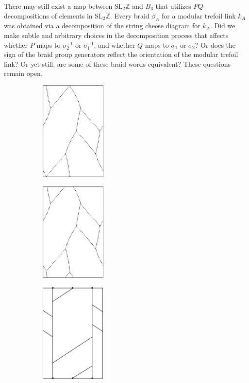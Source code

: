 \documentclass[12pt,twoside]{reedthesis}
\theoremstyle{definition}
\newcommand{\Z}{\mathbb{Z}}
\newcommand{\SLZ}{\mathrm{SL}_2{\Z}}
\begin{document}
There may still exist a map between $\SLZ$ and $B_3$ that utilizes $PQ$ decompositions of elements in $\SLZ$.
Every braid $\beta_A$ for a modular trefoil link $k_A$ was obtained via a decomposition of the string cheese diagram for $k_A$. 
Did we make subtle and arbitrary choices in the decomposition process that affects whether $P$ maps to $\sigma_2^{-1}$ or $\sigma_1^{-1}$, and whether $Q$ maps to $\sigma_1$ or $\sigma_2$?
Or does the sign of the braid group generators reflect the orientation of the modular trefoil link?
Or yet still, are some of these braid words equivalent? These questions remain open.

\begin{figure}[p]
  \centering
  \begin{subfigure}[t]{0.24\linewidth}
    \centering
    \includegraphics[height=5cm]{figures/subset_loop_ppqq.pdf}
    \caption{}
  \end{subfigure}
  \hfill
  \begin{subfigure}[t]{0.24\linewidth}
    \centering
    \includegraphics[height=5cm]{figures/subset_loop_ppqq_shifted.pdf}
    \caption{}
  \end{subfigure}
  \hfill
  \begin{subfigure}[t]{0.24\linewidth}
    \centering
    \includegraphics[height=5cm]{figures/subset_loop_ppqq_normalized.pdf}

\end{subfigure}
\end{figure}
\end{document}
